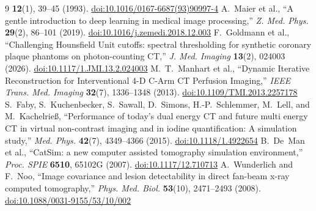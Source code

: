 \documentclass[]{spie}  %
\begin{document}
\begin{thebibliography}{9}
\textbf{12}(1), 39--45 (1993).
\href{https://doi.org/10.1016/0167-6687(93)90997-4}{doi:10.1016/0167-6687(93)90997-4}
 A.~Maier et al., ``A gentle introduction to deep learning in
medical image processing,'' \emph{Z. Med. Phys.} \textbf{29}(2), 86--101 (2019).
\href{https://doi.org/10.1016/j.zemedi.2018.12.003}{doi:10.1016/j.zemedi.2018.12.003}
 F.~Goldmann et al., ``Challenging Hounsfield Unit cutoffs: spectral thresholding for synthetic coronary plaque phantoms on photon-counting CT,'' \emph{J. Med. Imaging} \textbf{13}(2), 024003 (2026). \href{https://doi.org/10.1117/1.JMI.13.2.024003}{doi:10.1117/1.JMI.13.2.024003}
 M.~T.~Manhart et al., ``Dynamic Iterative Reconstruction for Interventional 4-D C-Arm CT Perfusion Imaging,'' \emph{IEEE Trans. Med. Imaging} \textbf{32}(7), 1336--1348 (2013). \href{https://doi.org/10.1109/TMI.2013.2257178}{doi:10.1109/TMI.2013.2257178}
 S.~Faby, S.~Kuchenbecker, S.~Sawall, D.~Simons, H.-P.~Schlemmer, M.~Lell, and M.~Kachelrie\ss, ``Performance of today's dual energy CT and future multi energy CT in virtual non-contrast imaging and in iodine quantification: A simulation study,'' \emph{Med. Phys.} \textbf{42}(7), 4349--4366 (2015). \href{https://doi.org/10.1118/1.4922654}{doi:10.1118/1.4922654}
 B.~De~Man et al., ``CatSim: a new computer assisted tomography simulation environment,'' \emph{Proc. SPIE} \textbf{6510}, 65102G (2007). \href{https://doi.org/10.1117/12.710713}{doi:10.1117/12.710713}
 A.~Wunderlich and F.~Noo, ``Image covariance and lesion detectability in direct fan-beam x-ray computed tomography,'' \emph{Phys. Med. Biol.} \textbf{53}(10), 2471--2493 (2008). \href{https://doi.org/10.1088/0031-9155/53/10/002}{doi:10.1088/0031-9155/53/10/002}
\end{thebibliography}
\end{document}
